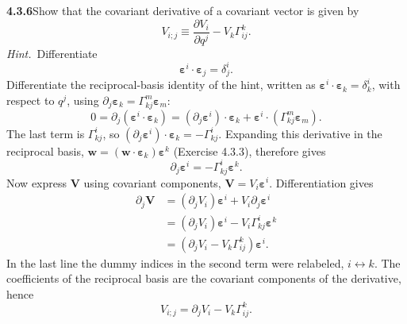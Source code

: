 \par\bigskip
\noindent\textbf{4.3.6}\quad Show that the covariant derivative of a covariant
vector is given by
\[
V_{i;j}\equiv\frac{\partial V_{i}}{\partial q^{j}}-V_{k}\Gamma_{ij}^{k}.
\]
\emph{Hint.}~Differentiate
\[
\boldsymbol{\varepsilon}^{i}\cdot\boldsymbol{\varepsilon}_{j}
=\delta_{j}^{i}.
\]
\solution
Differentiate the reciprocal-basis identity of the hint, written as
$\boldsymbol\varepsilon^i\cdot\boldsymbol\varepsilon_k=\delta^i_k$, with
respect to $q^j$, using
$\partial_j\boldsymbol\varepsilon_k=\Gamma^m_{kj}\boldsymbol\varepsilon_m$:
\[
0=\partial_j(\boldsymbol\varepsilon^i\cdot\boldsymbol\varepsilon_k)
=(\partial_j\boldsymbol\varepsilon^i)\cdot\boldsymbol\varepsilon_k
 +\boldsymbol\varepsilon^i\cdot
    (\Gamma^m_{kj}\boldsymbol\varepsilon_m).
\]
The last term is $\Gamma^i_{kj}$, so
$(\partial_j\boldsymbol\varepsilon^i)\cdot\boldsymbol\varepsilon_k
=-\Gamma^i_{kj}$. Expanding this derivative in the reciprocal basis,
$\mathbf w=(\mathbf w\cdot\boldsymbol\varepsilon_k)\boldsymbol\varepsilon^k$
(Exercise 4.3.3), therefore gives
\[
\partial_j\boldsymbol\varepsilon^i
=-\Gamma^i_{kj}\boldsymbol\varepsilon^k.
\]
Now express $\mathbf V$ using covariant components,
$\mathbf V=V_i\boldsymbol\varepsilon^i$. Differentiation gives
\begin{align*}
\partial_j\mathbf V
&=(\partial_jV_i)\boldsymbol\varepsilon^i
  +V_i\partial_j\boldsymbol\varepsilon^i\\
&=(\partial_jV_i)\boldsymbol\varepsilon^i
  -V_i\Gamma^i_{kj}\boldsymbol\varepsilon^k\\
&=(\partial_jV_i-V_k\Gamma^k_{ij})\boldsymbol\varepsilon^i.
\end{align*}
In the last line the dummy indices in the second term were relabeled,
$i\leftrightarrow k$.
The coefficients of the reciprocal basis are the covariant components
of the derivative, hence
\[
\boxed{V_{i;j}=\partial_jV_i-V_k\Gamma^k_{ij}}.
\]

